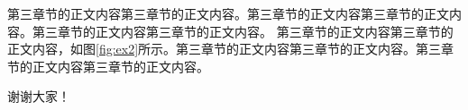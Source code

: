 \documentclass{yacauthesisug}
\begin{document}

第三章节的正文内容第三章节的正文内容。第三章节的正文内容第三章节的正文内容。第三章节的正文内容第三章节的正文内容。
第三章节的正文内容第三章节的正文内容，如图\ref{fig:ex2}所示。第三章节的正文内容第三章节的正文内容。第三章节的正文内容第三章节的正文内容。

\renewcommand{\sectionmark}[1]{\markboth{#1}{}}
\makebib

\begin{thank}
  谢谢大家！
\end{thank}


\end{document}
